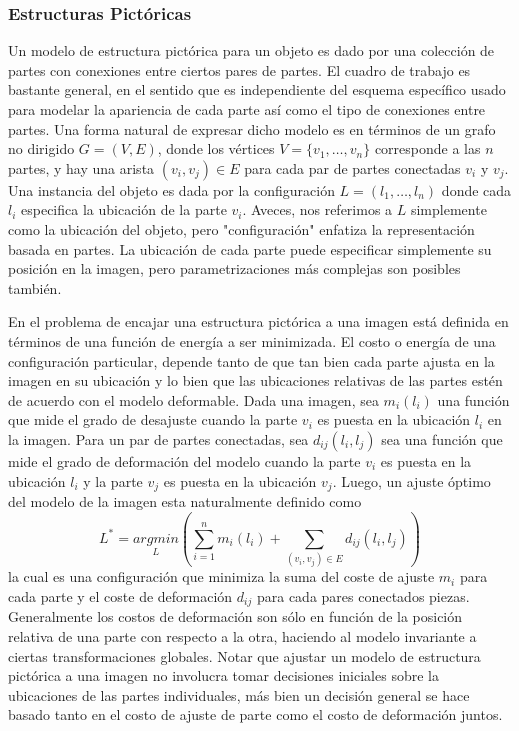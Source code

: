 \subsubsection{Estructuras Pictóricas}

	Un modelo de estructura pictórica para un objeto es dado por una colección de partes con conexiones entre ciertos pares de partes. El cuadro de trabajo es bastante general, en el sentido que es independiente del esquema específico usado para modelar la apariencia de cada parte así como el tipo de conexiones entre partes. Una forma natural de expresar dicho modelo es en términos de un grafo no dirigido $G=(V,E)$, donde los vértices $V=\{v_1,\dots,v_n \}$ corresponde a las $n$ partes, y hay una arista	 $(v_i,v_j) \in E$ para cada par de partes conectadas $v_i$ y $v_j$. Una instancia del objeto es dada por la configuración $L=(l_1,\dots,l_n)$ donde cada $l_i$ especifica la ubicación de la parte $v_i$. Aveces, nos referimos a $L$ simplemente como la ubicación del objeto, pero "configuración" enfatiza la representación basada en partes. La ubicación de cada parte puede especificar simplemente su posición en la imagen, pero parametrizaciones más complejas son posibles también.	
	
	En \cite{fischler} el problema de encajar una estructura pictórica a una imagen está definida en términos de una función de energía a ser minimizada. El costo o energía de una configuración particular, depende tanto de que tan bien cada parte ajusta en la imagen en su ubicación y lo bien que las ubicaciones relativas de las partes estén de acuerdo con el modelo deformable. Dada una imagen, sea $m_i(l_i)$ una función que mide el grado de desajuste cuando la parte $v_i$ es puesta en la ubicación $l_i$ en la imagen. Para un par de partes conectadas, sea $d_{ij}(l_i,l_j)$ sea una función que mide el grado de deformación del modelo cuando la parte $v_i$ es puesta en la ubicación $l_i$ y la parte $v_j$ es puesta en la ubicación $v_j$. Luego, un ajuste óptimo del modelo de la imagen esta naturalmente definido como
	$$L^*= \underset{L}{argmin}\left( \sum_{i=1}^nm_i(l_i) + \sum_{(v_i, v_j) \in E}d_{ij}(l_i, l_j) \right)$$
	la cual es una configuración que minimiza la suma del coste de ajuste $m_i$ para cada parte y el coste de deformación $d_{ij}$ para cada pares conectados piezas. Generalmente los costos de deformación son sólo en función de la posición relativa de una parte con respecto a la otra, haciendo al modelo invariante a ciertas transformaciones globales. Notar que ajustar un modelo de estructura pictórica a una imagen no involucra tomar decisiones iniciales sobre la ubicaciones de las partes individuales, más bien un decisión general se hace basado tanto en el costo de ajuste de parte como el costo de deformación juntos.
	
